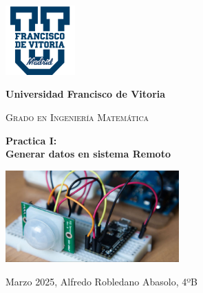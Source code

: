 
\begin{titlepage}
    \begin{center}
        \justify
        \vspace{1cm}
        
        \includegraphics[width=0.2\textwidth]{ImagenesLatex/ufv_logo}
        \vspace{1cm}
        
        \LARGE\textbf{Universidad Francisco de Vitoria}
        \vspace{0.5cm}
        
        \Large\textsc{Grado en Ingeniería Matemática}
        \vspace{1cm}
        
        
        \Huge\textbf{Practica I:\\Generar datos en sistema Remoto}

        \begin{center}
            \includegraphics[width=0.5\textwidth]{ImagenesLatex/sensor-pir-full.jpg}
        \end{center}

        \Large\textmd{Marzo 2025, Alfredo Robledano Abasolo, 4ºB}
        \vfill
        
    \end{center}
\end{titlepage}
